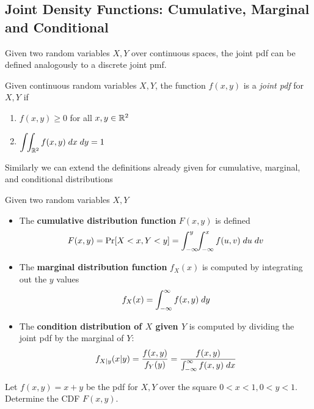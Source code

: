 \documentclass[../main.tex]{subfiles}
\begin{document}
\subsection{Joint Density Functions: Cumulative, Marginal and Conditional}
Given two random variables $X,Y$ over continuous spaces, the joint pdf can be defined
analogously to a discrete joint pmf.
\begin{definition}
Given continuous random variables $X,Y$, the function $f(x,y)$ is a \textit{joint pdf} for $X,Y$
if 
\begin{enumerate}
    \item $f(x,y) \geq 0$ for all $x,y \in \mathbb{R}^2$
    \item $\displaystyle\int\!\!\int_{\mathbb{R}^2} f(x,y) \;dx \;dy  = 1$
\end{enumerate}
\end{definition}
Similarly we can extend the definitions already given for cumulative, marginal, and conditional distributions
\begin{definition}
    Given two random variables $X,Y$
    \begin{itemize}
        \item The \textbf{cumulative distribution function} $F(x,y)$ is defined
        $$F(x,y) = \mathrm{Pr}[X<x,Y<y] = \int_{-\infty}^y \!\! \int_{-\infty}^x f(u,v) \;du \;dv$$
        \item The \textbf{marginal distribution function} $f_X(x)$ is computed
        by integrating out the $y$ values
        $$ f_X(x) = \int_{-\infty}^{\infty} f(x,y) \;dy $$
        \item The \textbf{condition distribution of $X$ given $Y$} is computed by dividing the 
        joint pdf by the marginal of $Y$:
        $$f_{X|y}(x|y) = \dfrac{f(x,y)}{f_Y(y)} = \dfrac{f(x,y)}{\int_{-\infty}^{\infty} f(x,y) \;dx }$$
    \end{itemize}
\end{definition}
\begin{example}
Let $f(x,y) = x+y$ be the pdf for $X,Y$ over the square $0<x<1, 0<y<1$. Determine the 
CDF $F(x,y)$.
\end{example}
\end{document}
